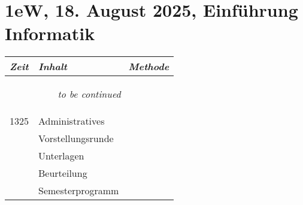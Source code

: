 \documentclass[a4paper]{scrreprt}
\begin{document}
\section*{1eW, 18. August 2025, Einführung Informatik}
\begin{longtable}{p{1.5cm}>{\RaggedRight}p{7.5cm}p{2.5cm}}
    \toprule
    \emph{Zeit}&\emph{Inhalt}&\emph{Methode}\\
    \midrule
    \endhead

    \midrule
    \multicolumn{3}{c}{\begin{tiny}\textit{to be continued}\end{tiny}}\\
    \midrule
    \endfoot

    \bottomrule
    \endlastfoot

    1325&Administratives&\\
        &Vorstellungsrunde&\\
        &Unterlagen&\\
        &Beurteilung&\\
        &Semesterprogramm&\\



\end{longtable}
\end{document}

